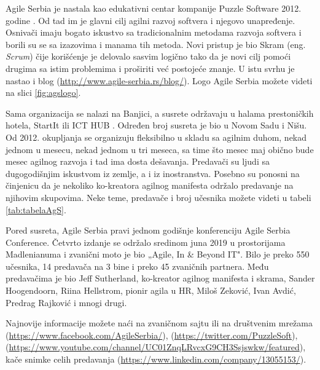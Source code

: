 \documentclass[a4paper]{article}
\begin{document}
{Agile Serbia je nastala kao edukativni centar kompanije Puzzle Software 2012. godine \cite{aboutAgS}. Od tad im je glavni cilj agilni razvoj softvera i njegovo unapređenje. Osnivači imaju bogato iskustvo sa tradicionalnim metodama razvoja softvera i borili su se sa izazovima i manama tih metoda. Novi pristup je bio Skram (eng. \textit{Scrum}) čije korišćenje je delovalo sasvim logično tako da je novi cilj pomoći drugima sa istim problemima i proširiti već postojeće znanje. U istu svrhu je nastao i blog (\url{http://www.agile-serbia.rs/blog/}). Logo Agile Serbia možete videti na slici \ref{fig:agslogo}.

Sama organizacija se nalazi na Banjici, a susrete održavaju u halama prestoničkih hotela, StartIt \cite{aboutStarit} ili ICT HUB \cite{aboutICT}. Određen broj susreta je bio u Novom Sadu i Nišu. Od 2012. okupljanja se organizuju fleksibilno u skladu sa agilnim duhom, nekad jednom u mesecu, nekad jednom u tri meseca, sa time što mesec maj obično bude mesec agilnog razvoja i tad ima dosta dešavanja. Predavači su ljudi sa dugogodišnjim iskustvom iz zemlje, a i iz inostranstva. Posebno su ponosni na činjenicu da je nekoliko ko-kreatora agilnog manifesta održalo predavanje na njihovim skupovima. Neke teme, predavače i broj učesnika možete videti u tabeli \ref{tab:tabelaAgS}.

Pored susreta, Agile Serbia pravi jednom godišnje konferenciju Agile Serbia Conference. Četvrto izdanje se održalo sredinom juna 2019 u prostorijama Madlenianuma i zvanični moto je bio „Agile, In \& Beyond IT". Bilo je preko 550 učesnika, 14 predavača na 3 bine i preko 45 zvaničnih partnera. Među predavačima je bio Jeff Sutherland, ko-kreator agilnog manifesta i skrama, Sander Hoogendoorn, Riina Hellstrom, pionir agila u HR, Miloš Zeković, Ivan Avdić, Predrag Rajković i mnogi drugi.

Najnovije informacije možete naći na zvaničnom sajtu \cite{aboutAgS} ili na društvenim mrežama (\url{https://www.facebook.com/AgileSerbia/}), (\url{https://twitter.com/PuzzleSoft}), (\url{https://www.youtube.com/channel/UC01ZnqLRvcxG9CH3Ssjswkw/featured}), kače snimke celih predavanja (\url{https://www.linkedin.com/company/13055153/}). 

}
\end{document}
